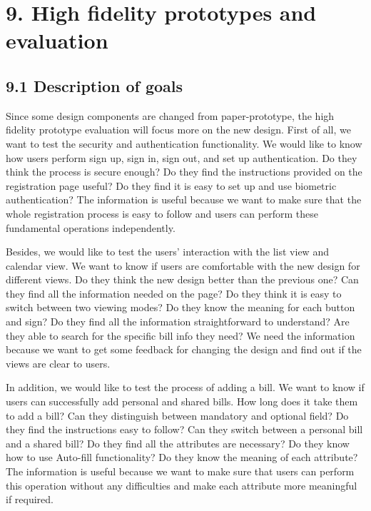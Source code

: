 \documentclass{sigchi}
\begin{document}
\section{9. High fidelity prototypes and evaluation}

\subsection{9.1 Description of goals}

Since some design components are changed from paper-prototype, the high fidelity prototype evaluation will focus more on the new design. First of all, we want to test the security and authentication functionality. We would like to know how users perform sign up, sign in, sign out, and set up authentication. Do they think the process is secure enough? Do they find the instructions provided on the registration page useful? Do they find it is easy to set up and use biometric authentication? The information is useful because we want to make sure that the whole registration process is easy to follow and users can perform these fundamental operations independently. 

Besides, we would like to test the users' interaction with the list view and calendar view. We want to know if users are comfortable with the new design for different views. Do they think the new design better than the previous one? Can they find all the information needed on the page? Do they think it is easy to switch between two viewing modes? Do they know the meaning for each button and sign? Do they find all the information straightforward to understand? Are they able to search for the specific bill info they need? We need the information because we want to get some feedback for changing the design and find out if the views are clear to users.  

In addition, we would like to test the process of adding a bill. We want to know if users can successfully add personal and shared bills. How long does it take them to add a bill? Can they distinguish between mandatory and optional field? Do they find the instructions easy to follow? Can they switch between a personal bill and a shared bill? Do they find all the attributes are necessary? Do they know how to use Auto-fill functionality? Do they know the meaning of each attribute? The information is useful because we want to make sure that users can perform this operation without any difficulties and make each attribute more meaningful if required.
\end{document}
